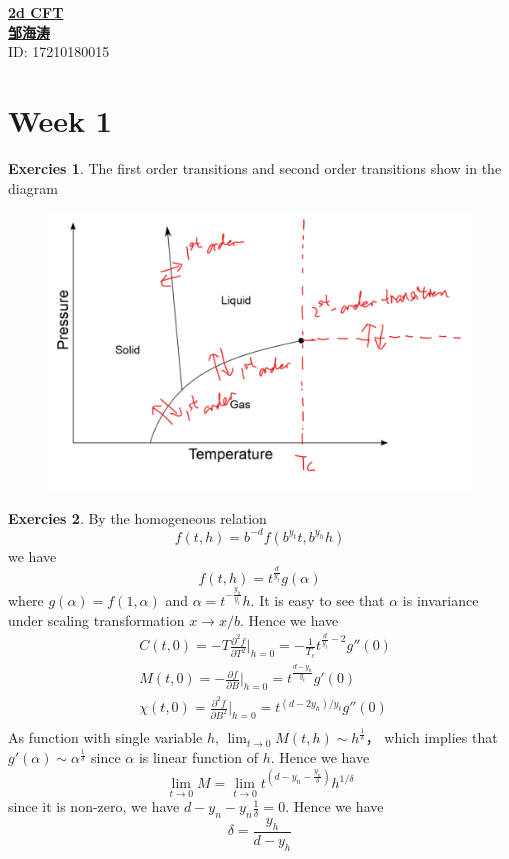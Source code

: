 \documentclass[11pt,a4paper]{article}
\theoremstyle{definition}
\newtheorem{exer}{Exercies}[subsection]
\begin{document}
\noindent
{\LARGE\underline{\textbf{2d CFT}}}\\
{\hfill\large  \underline{\textbf{邹海涛}} \\
	\hfill ID: 17210180015}\\
\section*{Week 1}
\begin{exer}
	The first order transitions and second order transitions show in the diagram
	\begin{figure}[h]
		\centering\includegraphics[scale=0.5]{PIC/hw1.png}
	\end{figure}
\end{exer}
\begin{exer}
	By the homogeneous relation
\[
f(t,h)= b^{-d}f(b^{y_t} t, b^{y_h} h)
\]
we have 
\[
f(t,h)= t^{\frac{d}{y_t}}g(\alpha)
\]
where $g(\alpha) = f(1,\alpha)$ and $\alpha = t^{-\frac{y_h}{y_t}}h$. It is easy to see that $\alpha$ is invariance under scaling transformation $x \to x/b$.
Hence we have 
\[
\begin{aligned}
&C(t,0) = -T \frac{\partial ^2 f}{\partial T ^2}\big|_{h=0} = - \frac{1}{T_c} t^{\frac{d}{y_t}-2}g''(0) \\
& M(t,0) = -\frac{\partial f}{\partial B}\big|_{h=0} =t^{\frac{d-y_h}{y_t}}g'(0)\\
& \chi(t,0) = \frac{\partial^2 f}{\partial B^2}\big|_{h=0} = t^{(d-2y_h)/y_t} g''(0)\\
\end{aligned}
\]
As function with single variable $h$, $\lim_{t \to 0}  M(t,h) \sim h^{\frac{1}{\delta}}$， which implies that $g'(\alpha) \sim \alpha^{\frac{1}{\delta}}$ since $\alpha$ is linear function of $h$. Hence we have 
\[
\lim_{t \to 0} M = \lim_{t \to 0} t^{(d-y_n - \frac{y_n}{\delta})}h ^{1/\delta}
\]
since it is non-zero, we have $d- y_n - y_n \frac{1}{\delta}=0$. Hence we have 
\[
\delta = \frac{y_h}{d-y_h}
\]	
\end{exer}
\end{document}

